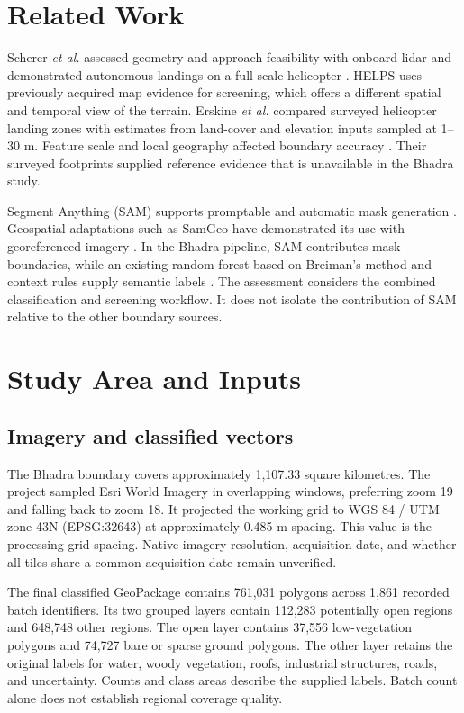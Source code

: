 \documentclass[journal]{IEEEtran}
\begin{document}
\section{Related Work}
Scherer \emph{et al.} assessed geometry and approach feasibility with onboard lidar and demonstrated autonomous landings on a full-scale helicopter \cite{scherer}. HELPS uses previously acquired map evidence for screening, which offers a different spatial and temporal view of the terrain. Erskine \emph{et al.} compared surveyed helicopter landing zones with estimates from land-cover and elevation inputs sampled at 1--30 m. Feature scale and local geography affected boundary accuracy \cite{erskine}. Their surveyed footprints supplied reference evidence that is unavailable in the Bhadra study.

Segment Anything (SAM) supports promptable and automatic mask generation \cite{sam}. Geospatial adaptations such as SamGeo have demonstrated its use with georeferenced imagery \cite{samgeo}. In the Bhadra pipeline, SAM contributes mask boundaries, while an existing random forest based on Breiman's method and context rules supply semantic labels \cite{neha,breiman}. The assessment considers the combined classification and screening workflow. It does not isolate the contribution of SAM relative to the other boundary sources.

\section{Study Area and Inputs}
\subsection{Imagery and classified vectors}
The Bhadra boundary covers approximately 1,107.33 square kilometres. The project sampled Esri World Imagery in overlapping windows, preferring zoom 19 and falling back to zoom 18. It projected the working grid to WGS 84 / UTM zone 43N (EPSG:32643) at approximately 0.485 m spacing. This value is the processing-grid spacing. Native imagery resolution, acquisition date, and whether all tiles share a common acquisition date remain unverified.

The final classified GeoPackage contains 761,031 polygons across 1,861 recorded batch identifiers. Its two grouped layers contain 112,283 potentially open regions and 648,748 other regions. The open layer contains 37,556 low-vegetation polygons and 74,727 bare or sparse ground polygons. The other layer retains the original labels for water, woody vegetation, roofs, industrial structures, roads, and uncertainty. Counts and class areas describe the supplied labels. Batch count alone does not establish regional coverage quality.
\end{document}
